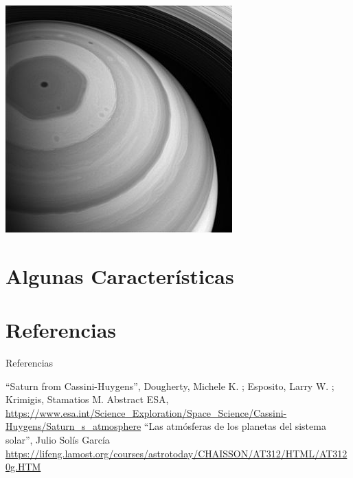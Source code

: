 \documentclass{beamer}
\begin{document}
\begin{frame}
    \centering
    \includegraphics[width=0.7\linewidth]{hexagon}
\end{frame}

\section{Algunas Características}


\section{Referencias}

\begin{frame}{Referencias}
\begin{thebibliography}{9}
     ``Saturn from Cassini-Huygens'', Dougherty, Michele K. ; Esposito, Larry W. ; Krimigis, Stamatios M. Abstract
     ESA, \url{https://www.esa.int/Science_Exploration/Space_Science/Cassini-Huygens/Saturn_s_atmosphere}
     ``Las atmósferas de los planetas del sistema solar'', Julio Solís García
     \url{https://lifeng.lamost.org/courses/astrotoday/CHAISSON/AT312/HTML/AT3120g.HTM}

\end{thebibliography}
\end{frame}
\end{document}
